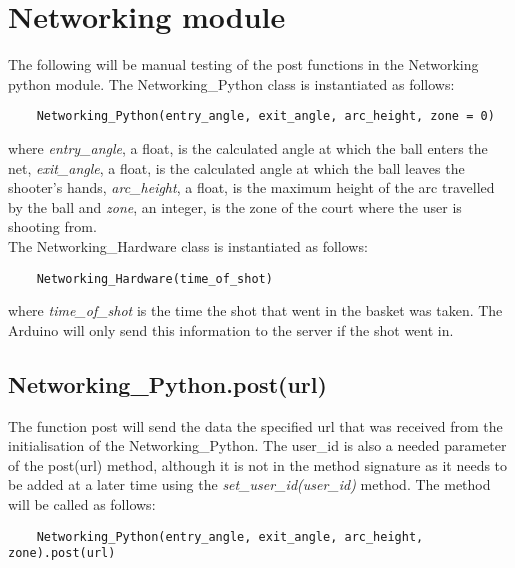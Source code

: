 \section{Networking module}
The following will be manual testing of the post functions in the Networking python module. The Networking\_Python class is instantiated as follows:
\begin{verbatim}
    Networking_Python(entry_angle, exit_angle, arc_height, zone = 0)
\end{verbatim}
where \textit{entry\_angle}, a float, is the calculated angle at which the ball enters the net, \textit{exit\_angle}, a float, is the calculated angle at which the ball leaves the shooter's hands, \textit{arc\_height}, a float, is the maximum height of the arc travelled by the ball and \textit{zone}, an integer, is the zone of the court where the user is shooting from.
\\

The Networking\_Hardware class is instantiated as follows:
\begin{verbatim}
    Networking_Hardware(time_of_shot)
\end{verbatim}

where \textit{time\_of\_shot} is the time the shot that went in the basket was taken. The Arduino will only send this information to the server if the shot went in.


\subsection{Networking\_Python.post(url)} \label{test_netpy}
The function post will send the data the specified url that was received from the initialisation of the Networking\_Python. The user\_id is also a needed parameter of the post(url) method, although it is not in the method signature as it needs to be added at a later time using the \textit{set\_user\_id(user\_id)} method. The method will be called as follows:
\begin{verbatim}
    Networking_Python(entry_angle, exit_angle, arc_height, zone).post(url)
\end{verbatim}

